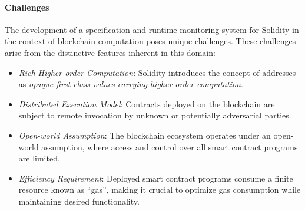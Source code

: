 










\paragraph{Challenges}
The development of a specification and runtime monitoring system for Solidity in the context of blockchain computation poses unique challenges.
These challenges arise from the distinctive features inherent in this domain:


\begin{itemize}
  \item \textit{Rich Higher-order Computation}:
    Solidity introduces the concept of addresses as \emph{opaque first-class values carrying higher-order computation}. 
  \item \textit{Distributed Execution Model}:
    Contracts deployed on the blockchain are subject to remote invocation by unknown or potentially adversarial parties. 
  \item \textit{Open-world Assumption}:
    The blockchain ecosystem operates under an open-world assumption, where access and control over all smart contract programs are limited. 
  \item \textit{Efficiency Requirement}:
    Deployed smart contract programs consume a finite resource known as ``gas'', making it crucial to optimize gas consumption while maintaining desired functionality. 
\end{itemize}

